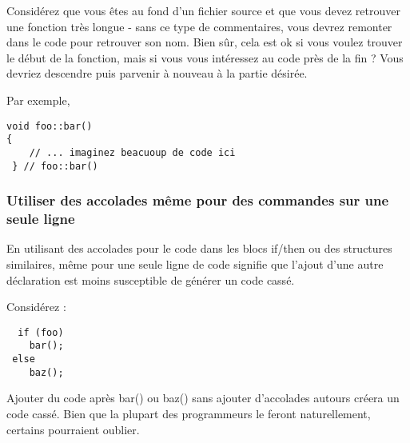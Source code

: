 Consid\'erez que vous \^etes au fond d'un fichier source et que vous devez retrouver une fonction tr\`es longue - sans ce type de commentaires, vous devrez remonter dans le code pour retrouver son nom. Bien s\^ur, cela est ok si vous voulez trouver le d\'ebut de la fonction, mais si vous vous int\'eressez au code pr\`es de la fin ? Vous devriez descendre puis parvenir \`a nouveau \`a la partie d\'esir\'ee.

Par exemple,

\begin{verbatim}
void foo::bar()
{ 
    // ... imaginez beacuoup de code ici
 } // foo::bar()
\end{verbatim}

\subsubsection{Utiliser des accolades m\^eme pour des commandes sur une seule ligne}
En utilisant des accolades pour le code dans les blocs if/then ou des structures similaires, m\^eme pour une seule ligne de code signifie que l'ajout d'une autre d\'eclaration est moins susceptible de g\'en\'erer un code cass\'e.

Consid\'erez :

\begin{verbatim}
  if (foo)
    bar();
 else
    baz();
\end{verbatim}

Ajouter du code apr\`es bar() ou baz() sans ajouter d'accolades autours cr\'eera un code cass\'e. Bien que la plupart des programmeurs le feront naturellement, certains pourraient oublier.

